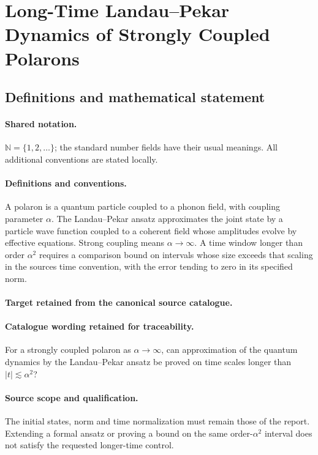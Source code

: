 \documentclass[11pt]{article}
\begin{document}
\section{Long-Time Landau–Pekar Dynamics of Strongly Coupled Polarons}\label{statement}

\subsection{Definitions and mathematical statement}

\paragraph{Shared notation.}$\mathbb N=\{1,2,\ldots\}$; the standard number fields have their usual meanings. All additional conventions are stated locally.


\paragraph{Definitions and conventions.}
A polaron is a quantum particle coupled to a phonon field, with coupling parameter $\alpha$. The Landau--Pekar ansatz approximates the joint state by a particle wave function coupled to a coherent field whose amplitudes evolve by effective equations. Strong coupling means $\alpha\to\infty$. A time window longer than order $\alpha^2$ requires a comparison bound on intervals whose size exceeds that scaling in the source\textquotesingle s time convention, with the error tending to zero in its specified norm.

\paragraph{Target retained from the canonical source catalogue.}
\paragraph{Catalogue wording retained for traceability.}
For a strongly coupled polaron as $\alpha\to\infty$, can approximation of the quantum dynamics by the Landau–Pekar ansatz be proved on time scales longer than $\lvert t\rvert\lesssim\alpha^2$?

\paragraph{Source scope and qualification.}
The initial states, norm and time normalization must remain those of the report. Extending a formal ansatz or proving a bound on the same order-$\alpha^2$ interval does not satisfy the requested longer-time control.
\end{document}
